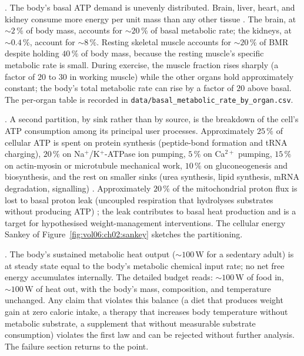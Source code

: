 . The body's basal ATP demand is
unevenly distributed. Brain, liver, heart, and kidney consume more
energy per unit mass than any other tissue
\cite{paper:v6c02-elia-organ-bmr-1992}. The brain, at $\sim 2\,\%$
of body mass, accounts for $\sim 20\,\%$ of basal metabolic rate;
the kidneys, at $\sim 0.4\,\%$, account for $\sim 8\,\%$. Resting
skeletal muscle accounts for $\sim 20\,\%$ of BMR despite holding
$40\,\%$ of body mass, because the resting muscle's specific
metabolic rate is small. During exercise, the muscle fraction rises
sharply (a factor of $20$ to $30$ in working muscle) while the other
organs hold approximately constant; the body's total metabolic rate
can rise by a factor of $20$ above basal. The per-organ table is
recorded in \texttt{data/basal\_metabolic\_rate\_by\_organ.csv}.

. A second partition, by sink rather than
by source, is the breakdown of the cell's ATP consumption among its
principal user processes. Approximately $25\,\%$ of cellular ATP is
spent on protein synthesis (peptide-bond formation and tRNA charging),
$20\,\%$ on Na$^+$/K$^+$-ATPase ion pumping, $5\,\%$ on Ca$^{2+}$
pumping, $15\,\%$ on actin-myosin or microtubule mechanical work,
$10\,\%$ on gluconeogenesis and biosynthesis, and the rest on smaller
sinks (urea synthesis, lipid synthesis, mRNA degradation, signalling)
\cite{paper:v6c02-rolfe-brown-1997}. Approximately $20\,\%$ of the
mitochondrial proton flux is lost to basal proton leak (uncoupled
respiration that hydrolyses substrates without producing ATP)
\cite{paper:v6c02-jastroch-uncoupling-2010}; the leak contributes to
basal heat production and is a target for hypothesised
weight-management interventions. The cellular energy Sankey of
Figure~\ref{fig:vol06:ch02:sankey} sketches the partitioning.



. The body's
sustained metabolic heat output ($\sim 100\,\text{W}$ for a sedentary
adult) is at steady state equal to the body's metabolic chemical
input rate; no net free energy accumulates internally. The detailed
budget reads: $\sim 100\,\text{W}$ of food in, $\sim 100\,\text{W}$ of
heat out, with the body's mass, composition, and temperature
unchanged. Any claim that violates this balance (a diet that produces
weight gain at zero caloric intake, a therapy that increases body
temperature without metabolic substrate, a supplement that
 without measurable substrate consumption)
violates the first law and can be rejected without further analysis.
The failure section returns to the point.

